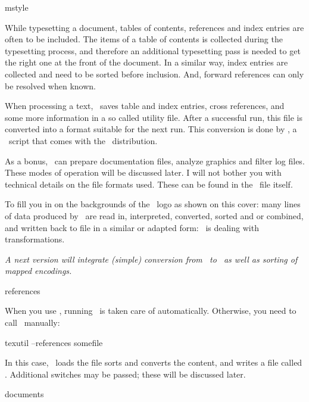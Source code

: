 
\environment mstyle


\subject {Introduction}

While typesetting a document, tables of contents, references and index
entries are often to be included. The items of a table of contents is
collected during the typesetting process, and therefore an additional
typesetting pass is needed to get the right one at the front of the document.
In a similar way, index entries are collected and need to be sorted before
inclusion. And, forward references can only be resolved when known. 

When processing a text, \CONTEXT\ saves table and index entries, cross
references, and some more information in a so called utility file. After a
successful run, this file is converted into a format suitable for the next
run. This conversion is done by \TEXUTIL, a \PERL\ script that comes with the
\CONTEXT\ distribution. 

As a bonus, \TEXUTIL\ can prepare documentation files, analyze graphics and
filter log files. These modes of operation will be discussed later. I will
not bother you with technical details on the file formats used. These can be
found in the \PERL\ file itself. 

To fill you in on the backgrounds of the \TEXUTIL\ logo as shown on this
cover: many lines of data produced by \CONTEXT\ are read in, interpreted,
converted, sorted and or combined, and written back to file in a similar or
adapted form: \TEXUTIL\ is dealing with transformations. 

{\em A next version will integrate (simple) conversion from \SGML\ to \TEX\ 
as well as sorting of mapped encodings.}

\subject {Running} 

\switch references   

When you use \TEXEXEC, running \TEXUTIL\ is taken care of automatically.
Otherwise, you need to call \TEXUTIL\ manually: 

\starttyping
texutil  --references  somefile
\stoptyping

In this case, \TEXUTIL\ loads the file  sorts and
converts the content, and writes a file called \type {somefile.tuo}.
Additional switches may be passed; these will be discussed later. 

\switch documents   

